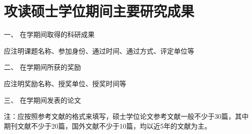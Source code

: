 
{}
\titlespacing{\chapter}{0pt}{-1em}{1em}
\chapter*{攻读硕士学位期间主要研究成果}

\noindent
一、	在学期间取得的科研成果

应注明课题名称、参加身份、通过时间、通过方式、评定单位等

\noindent
二、	在学期间所获的奖励

应注明奖励名称、授奖单位、授奖时间等

\noindent
三、	在学期间发表的论文

注：应按照参考文献的格式来填写，硕士学位论文参考文献一般不少于30篇，其中期刊文献不少于20篇，国外文献不少于10篇，均以近5年的文献为主。
